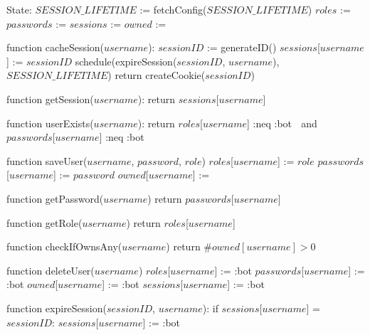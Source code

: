 State:
    $SESSION\_LIFETIME$ := fetchConfig($SESSION\_LIFETIME$)
    $roles$ := {}
    $passwords$ := {}
    $sessions$ := {}
    $owned$ := {}

function cacheSession($username$):
    $sessionID$ := generateID()
    $sessions$[$username$] := $sessionID$
    schedule(expireSession($sessionID$, $username$), $SESSION\_LIFETIME$)
    return createCookie($sessionID$)

function getSession($username$):
    return $sessions$[$username$]

function userExists($username$):
    return $roles$[$username$] :neq :bot $\;$ and $passwords$[$username$] :neq :bot

function saveUser($username$, $password$, $role$)
    $roles$[$username$] := $role$
    $passwords$[$username$] := $password$
    $owned$[$username$] := {}

function getPassword($username$)
    return $passwords$[$username$]    

function getRole($username$)
    return $roles$[$username$] 

function checkIfOwnsAny($username$)
    return $\#owned[username] > 0$ 

function deleteUser($username$)
    $roles$[$username$] := :bot
    $passwords$[$username$] := :bot
    $owned$[$username$] := :bot
    $sessions$[$username$] := :bot

function expireSession($sessionID$, $username$):
    if $sessions$[$username$] = $sessionID$:
        $sessions$[$username$] := :bot